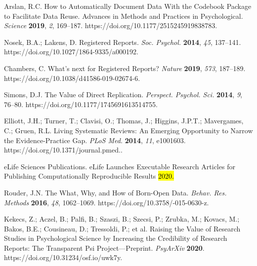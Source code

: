 \documentclass[psych,tutorial,accept,moreauthors,pdftex]{Definitions/mdpi}
\begin{document}
\begin{thebibliography}{999}
Arslan, R.C. How to Automatically Document Data With the Codebook Package to Facilitate Data Reuse. Advances in Methods and Practices in Psychological. \emph{Science} \textbf{2019}, \emph{2}, 169--187. https://doi.org/10.1177/2515245919838783.


Nosek, B.A.; Lakens, D. Registered Reports. \emph{Soc. Psychol.} \textbf{2014}, \emph{45}, 137--141. https://doi.org/10.1027/1864-9335/a000192.


Chambers, C. What’s next for Registered Reports? \emph{Nature} \textbf{2019}, \emph{573}, 187--189. https://doi.org/10.1038/d41586-019-02674-6.

Simons, D.J. The Value of Direct Replication. \emph{Perspect. Psychol. Sci.} \textbf{2014}, \emph{9}, 76--80. https://doi.org/10.1177/1745691613514755.

Elliott, J.H.; Turner, T.; Clavisi, O.; Thomas, J.; Higgins, J.P.T.; Mavergames, C.; Gruen, R.L. Living Systematic Reviews: An Emerging Opportunity to Narrow the Evidence-Practice Gap. \emph{PLoS Med.} \textbf{2014}, \emph{11}, e1001603. https://doi.org/10.1371/journal.pmed..

eLife Sciences Publications. eLife Launches Executable Research Articles for Publishing Computationally Reproducible Results \hl{2020.}%


Rouder, J.N. The What, Why, and How of Born-Open Data. \emph{Behav. Res. Methods} \textbf{2016}, \emph{48}, 1062--1069. https://doi.org/10.3758/-015-0630-z.


Kekecs, Z.; Aczel, B.; Palfi, B.; Szaszi, B.; Szecsi, P.; Zrubka, M.; Kovacs, M.; Bakos, B.E.; Cousineau, D.; Tressoldi, P.; et al. Raising the Value of Research Studies in Psychological Science by Increasing the Credibility of Research Reports: The Transparent Psi Project—Preprint. \emph{PsyArXiv} \textbf{2020}. https://doi.org/10.31234/osf.io/uwk7y.



\end{thebibliography}
\end{document}
